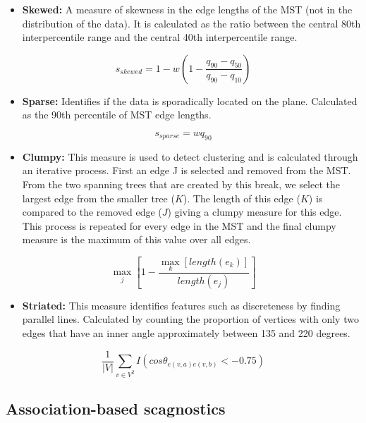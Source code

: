 \begin{itemize}
\tightlist
\item
  \textbf{Skewed:} A measure of skewness in the edge lengths of the MST
  (not in the distribution of the data). It is calculated as the ratio
  between the central 80th interpercentile range and the central 40th
  interpercentile range.
\end{itemize}

\[s_{skewed} = 1-w(1-\frac{q_{90}-{q_{50}}}{q_{90}-q_{10}})\]

\begin{itemize}
\tightlist
\item
  \textbf{Sparse:} Identifies if the data is sporadically located on the
  plane. Calculated as the 90th percentile of MST edge lengths.
\end{itemize}

\[s_{sparse}= wq_{90}\]

\begin{itemize}
\tightlist
\item
  \textbf{Clumpy:} This measure is used to detect clustering and is
  calculated through an iterative process. First an edge J is selected
  and removed from the MST. From the two spanning trees that are created
  by this break, we select the largest edge from the smaller tree
  (\(K\)). The length of this edge (\(K\)) is compared to the removed
  edge (\(J\)) giving a clumpy measure for this edge. This process is
  repeated for every edge in the MST and the final clumpy measure is the
  maximum of this value over all edges.
\end{itemize}

\[\max_{j}[1-\frac{\max_{k}[length(e_k)]}{length(e_j)}]\]

\begin{itemize}
\tightlist
\item
  \textbf{Striated:} This measure identifies features such as
  discreteness by finding parallel lines. Calculated by counting the
  proportion of vertices with only two edges that have an inner angle
  approximately between 135 and 220 degrees.
\end{itemize}

\[\frac1{|V|}\sum_{v \in V^{2}}I(cos\theta_{e(v,a)e(v,b)}<-0.75)\]

\hypertarget{association-based-scagnostics}{%
\subsection{Association-based
scagnostics}\label{association-based-scagnostics}}

